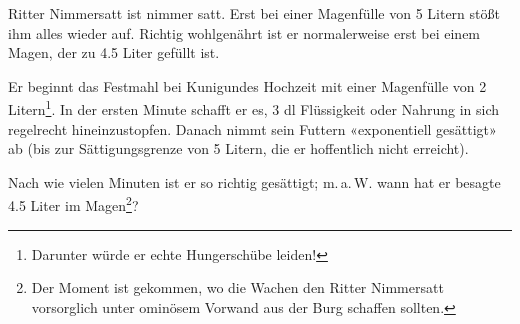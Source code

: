 Ritter Nimmersatt ist nimmer satt. Erst bei einer Magenfülle von
5 Litern stößt ihm alles wieder auf. Richtig wohlgenährt ist er
normalerweise erst bei einem Magen, der zu 4.5 Liter gefüllt ist.

Er beginnt das Festmahl bei Kunigundes Hochzeit mit einer Magenfülle
von 2 Litern\footnote{Darunter würde er echte Hungerschübe
  leiden!}. In der ersten Minute schafft er es, 3 dl Flüssigkeit oder Nahrung
in sich regelrecht hineinzustopfen. Danach nimmt sein Futtern
«exponentiell gesättigt» ab (bis zur Sättigungsgrenze von 5 Litern, die er
hoffentlich nicht erreicht).

Nach wie vielen Minuten ist er so richtig gesättigt; m.\,a.\,W. wann
hat er besagte 4.5 Liter im Magen\footnote{Der Moment ist gekommen, wo
  die Wachen den Ritter Nimmersatt vorsorglich unter ominösem Vorwand aus der Burg schaffen sollten.}?






\newpage
